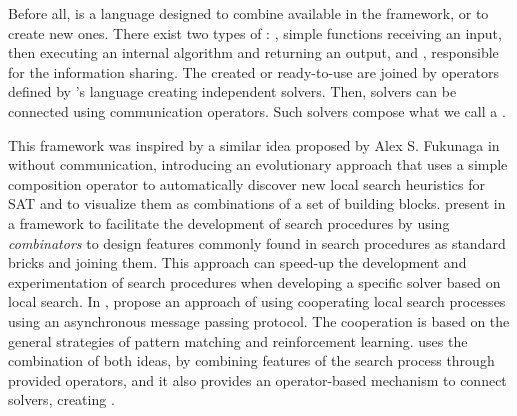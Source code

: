 Before all, \posl{} is a language designed to combine \ms{} available in the framework, or to create new ones. There exist two types of \ms{}: \oms{}, simple functions receiving an input, then executing an internal algorithm and returning an output, and \opchs{}, responsible for the information sharing.
The created or ready-to-use \ms{} are joined by operators defined by \posl's language creating independent solvers. Then, solvers can be connected %
using communication operators. Such solvers compose what we call a \soset. %


This framework was inspired by a similar idea proposed by Alex S. Fukunaga in \cite{Fukunaga2008} without communication, introducing an evolutionary approach that uses a simple composition operator to automatically discover new local search heuristics for SAT and to  visualize them as combinations of a set of building blocks.  present in \cite{Landtsheer2015} a framework to facilitate the development of search procedures by using \textit{combinators} to design features commonly found in search procedures as standard bricks and joining them. This approach can speed-up the development and experimentation of search procedures when developing a specific solver based on local search. In \cite{Martin2016},  propose an approach of using cooperating local search processes using an asynchronous message passing protocol. The cooperation is based on the general strategies of pattern matching and reinforcement learning. \posl{} uses the combination of both ideas, by combining features of the search process through provided operators, and it also provides an operator-based mechanism to connect solvers, creating \comstrs.


